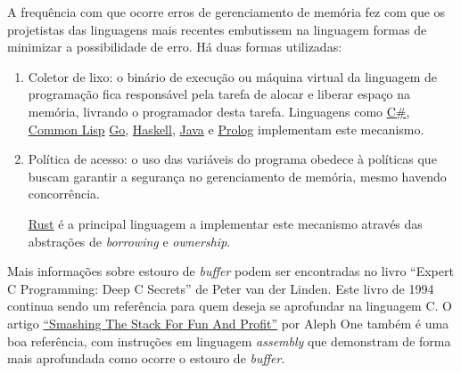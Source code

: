 \begin{frame}[fragile]{}\small

A frequência com que ocorre erros de gerenciamento de memória fez com
que os projetistas das linguagens mais recentes embutissem na
linguagem formas de minimizar a possibilidade de erro. Há duas
formas utilizadas:

\begin{enumerate}
\item Coletor de lixo: o binário de execução ou máquina virtual da
linguagem de programação fica responsável pela tarefa de alocar e
liberar espaço na memória, livrando o programador desta tarefa. Linguagens
como
 \href{https://docs.microsoft.com/pt-br/dotnet/csharp/programming-guide/}{C\#},
 \href{http://lisp-lang.org/}{Common Lisp}
 \href{https://golang.org/}{Go}, \href{https://www.haskell.org/}{Haskell},
 \href{https://www.java.com/en/}{Java} e \href{http://www.swi-prolog.org/}{Prolog}
 implementam este mecanismo.
 \pause
\item Política de acesso: o uso das variáveis do programa obedece à
   políticas que buscam garantir a segurança no gerenciamento
   de memória, mesmo havendo concorrência.
   
   \href{https://www.rust-lang.org/pt-BR/}{Rust} é a principal linguagem
   a implementar este mecanismo através das abstrações de {\it borrowing\/}
   e {\it ownership\/}.
\end{enumerate}

\end{frame}

\begin{frame}{}

Mais informações sobre estouro de {\it buffer} podem ser encontradas
no livro ``Expert C Programming: Deep C Secrets'' de Peter van der
Linden. Este livro de 1994 continua sendo um referência para quem
deseja se aprofundar na linguagem C. O artigo
\href{http://insecure.org/stf/smashstack.html}{``Smashing The Stack For Fun And Profit''}
por Aleph One também é uma boa referência, com instruções em linguagem
{\it assembly\/} que demonstram de forma mais aprofundada como ocorre o
estouro de {\it buffer\/}.

\end{frame}


